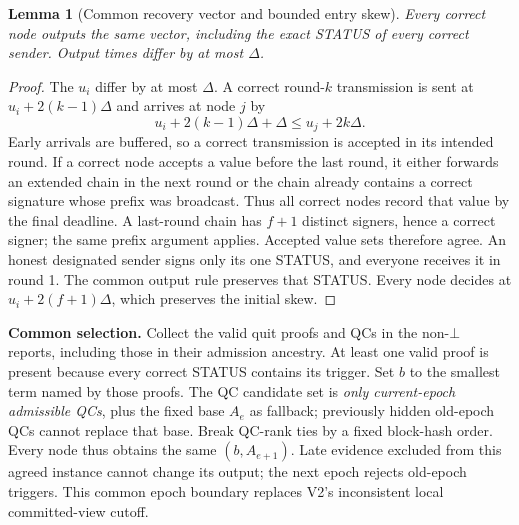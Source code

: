 \documentclass[10pt,a4paper]{article}
\newtheorem{lemma}{Lemma}
\begin{document}
\begin{lemma}[Common recovery vector and bounded entry skew]
Every correct node outputs the same vector, including the exact STATUS of
every correct sender. Output times differ by at most $\Delta$.
\end{lemma}
\begin{proof}
The $u_i$ differ by at most $\Delta$. A correct round-$k$ transmission is
sent at $u_i+2(k-1)\Delta$ and arrives at node $j$ by
\[
 u_i+2(k-1)\Delta+\Delta\le u_j+2k\Delta.
\]
Early arrivals are buffered, so a correct transmission is accepted in its
intended round. If a correct node accepts a value before the last round,
it either forwards an extended chain in the next round or the chain already
contains a correct signature whose prefix was broadcast. Thus all correct
nodes record that value by the final deadline. A last-round chain has
$f+1$ distinct signers, hence a correct signer; the same prefix argument
applies. Accepted value sets therefore agree. An honest designated sender
signs only its one STATUS, and everyone receives it in round 1. The common
output rule preserves that STATUS. Every node decides at $u_i+2(f+1)\Delta$,
which preserves the initial skew.
\end{proof}

\textbf{Common selection.} Collect the valid quit proofs and QCs in the
non-$\bot$ reports, including those in their admission ancestry. At least one
valid proof is present because every correct STATUS contains its trigger.
Set $b$ to the smallest term named by those proofs. The QC candidate set is
\emph{only current-epoch admissible QCs}, plus the fixed base $A_e$ as fallback;
previously hidden old-epoch QCs cannot replace that base. Break QC-rank ties
by a fixed block-hash order. Every node thus obtains the same $(b,A_{e+1})$.
Late evidence excluded from this agreed instance cannot change its output;
the next epoch rejects old-epoch triggers. This common epoch boundary
replaces V2's inconsistent local committed-view cutoff.

\clearpage
\end{document}
